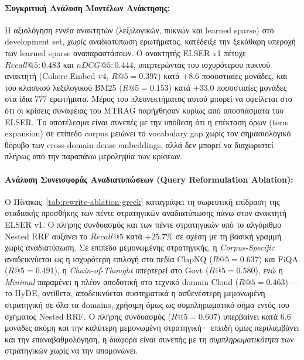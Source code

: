 \paragraph{Συγκριτική Ανάλυση Μοντέλων Ανάκτησης:}
Η αξιολόγηση εννέα ανακτητών (λεξιλογικών, πυκνών και learned sparse) στο development set, \textit{χωρίς} αναδιατύπωση ερωτήματος, κατέδειξε την ξεκάθαρη υπεροχή των learned sparse αναπαραστάσεων. Ο ανακτητής ELSER v1 πέτυχε $Recall@5: 0.483$ και $nDCG@5: 0.444$, υπερτερώντας του ισχυρότερου πυκνού ανακτητή (Cohere Embed v4, $R@5{=}0.397$) κατά $+8.6$ ποσοστιαίες μονάδες, και του κλασικού λεξιλογικού BM25 ($R@5{=}0.153$) κατά $+33.0$ ποσοστιαίες μονάδες στα ίδια $777$ ερωτήματα. Μέρος του πλεονεκτήματος αυτού μπορεί να οφείλεται στο ότι οι κρίσεις συνάφειας του MTRAG παρήχθησαν κυρίως από αποσπάσματα του ELSER. Το αποτέλεσμα είναι συνεπές με την υπόθεση ότι η επέκταση όρων (term expansion) σε επίπεδο corpus μειώνει το vocabulary gap χωρίς τον σημασιολογικό θόρυβο των cross-domain dense embeddings, αλλά δεν μπορεί να διαχωριστεί πλήρως από την παραπάνω μεροληψία των κρίσεων.

\paragraph{Ανάλυση Συνεισφοράς Αναδιατυπώσεων (Query Reformulation Ablation):}
Ο Πίνακας~\ref{tab:rewrite-ablation-greek} καταγράφει τη σωρευτική επίδραση της σταδιακής προσθήκης των πέντε στρατηγικών αναδιατύπωσης πάνω στον ανακτητή ELSER v1. Ο πλήρης συνδυασμός και των πέντε στρατηγικών υπό το αλγόριθμο Nested RRF αυξάνει το $Recall@5$ κατά \textbf{$+25.7\%$} σε σχέση με τη βασική γραμμή χωρίς αναδιατύπωση. Σε επίπεδο μεμονωμένης στρατηγικής, η \textit{Corpus-Specific} αναδεικνύεται ως η ισχυρότερη επιλογή στα πεδία ClapNQ ($R@5{=}0.637$) και FiQA ($R@5{=}0.491$), η \textit{Chain-of-Thought} υπερτερεί στο Govt ($R@5{=}0.580$), ενώ η \textit{Minimal} παραμένει η πλέον αποδοτική στο τεχνικό domain Cloud ($R@5{=}0.463$) — το HyDE, αντίθετα, αποδεικνύεται συστηματικά η ασθενέστερη μεμονωμένη στρατηγική σε όλα τα domains, χρήσιμη όμως ως συμπληρωματικό σήμα εντός του σχήματος Nested RRF. Ο πλήρης συνδυασμός ($R@5{=}0.607$) υπερβαίνει κατά $6.6$ μονάδες ακόμη και την καλύτερη μεμονωμένη στρατηγική· επειδή όμως περιλαμβάνει και την επαναβαθμολόγηση, η διαφορά είναι συνεπής με τη \textit{συμπληρωματικότητα} των στρατηγικών χωρίς να την απομονώνει.

